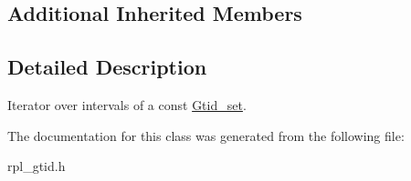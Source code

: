 \subsection*{Additional Inherited Members}


\subsection{Detailed Description}
Iterator over intervals of a const \mbox{\hyperlink{classGtid__set}{Gtid\+\_\+set}}. 

The documentation for this class was generated from the following file\+:\begin{DoxyCompactItemize}
\item 
rpl\+\_\+gtid.\+h\end{DoxyCompactItemize}
